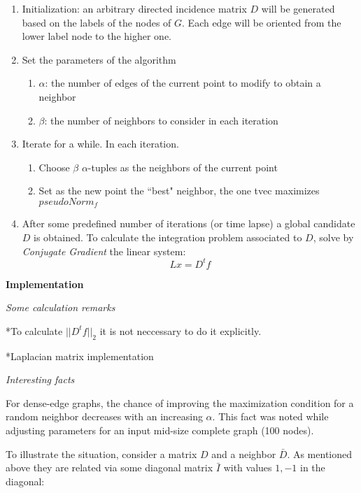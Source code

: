 \documentclass[a4paper,11pt]{article}
\begin{document}
\begin{enumerate}
	\item Initialization: an arbitrary directed incidence matrix $D$ 
	will be generated based on the labels of the nodes of $G$. Each edge 
	will be oriented from the lower label node to the higher one. 
	\item Set the parameters of the algorithm
	\begin{enumerate}
		\item $\alpha$: the number of edges of the current point to 
		modify to obtain a neighbor
		\item $\beta$: the number of neighbors to consider in each 
		iteration
	\end{enumerate}
	\item Iterate for a while. In each iteration.
	\begin{enumerate}
		\item Choose $\beta$ $\alpha$-tuples as the neighbors of the
		current point
		\item Set as the new point the ``best" neighbor, the one tvec 
		maximizes $pseudoNorm_f$
 	\end{enumerate}
	\item After some predefined number of iterations (or time lapse) a  
	global candidate $D$ is obtained. To calculate the integration 
	problem associated to $D$, solve by \textit{Conjugate Gradient} 
	the linear system:
	$$L x = D^t f$$
\end{enumerate}

\bigskip

\textbf{Implementation}

\bigskip

\emph{Some calculation remarks}

\bigskip

*To calculate $||D^t f||_2$ it is not neccessary to do it explicitly.

*Laplacian matrix implementation

\bigskip

\emph{Interesting facts}

\bigskip

For dense-edge graphs, the chance of improving the maximization 
condition for a random neighbor decreases with an increasing $\alpha$. 
This fact was noted while adjusting parameters for an input mid-size 
complete graph (100 nodes). 

\bigskip

To illustrate the situation, consider a matrix $D$ and a neighbor 
$\bar{D}$. As mentioned above they are related via some diagonal matrix 
$\bar{I}$ with values $1,-1$ in the diagonal:
\end{document}
